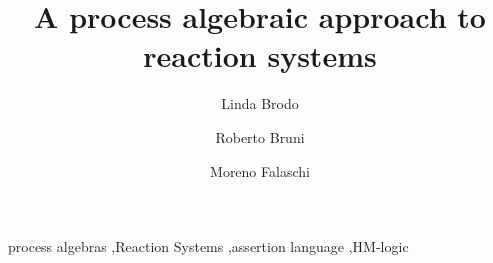 \documentclass{elsarticle}
\begin{document}
\begin{frontmatter}

\title{A process algebraic approach to reaction systems
}



 \author[uniss]{Linda Brodo}
 
 \author[unipi]{Roberto Bruni}
 
 \author[unisi]{Moreno Falaschi}
 
 \address[unipi]{Dipartimento di Informatica, Universit\`{a} di Pisa, Italy}
 \address[uniss]{Dipartimento di Scienze Economiche e Aziendali,   Universit\`a di Sassari, Italy}
 \address[unisi]{Dipartimento di Ingegneria dell'Informazione e Scienze Matematiche,   Univ. di Siena, Italy}
 



\begin{abstract}

\end{abstract}

\begin{keyword}
process algebras \sep Reaction Systems \sep assertion language \sep HM-logic
\end{keyword}

\end{frontmatter}

\linenumbers
\end{document}
